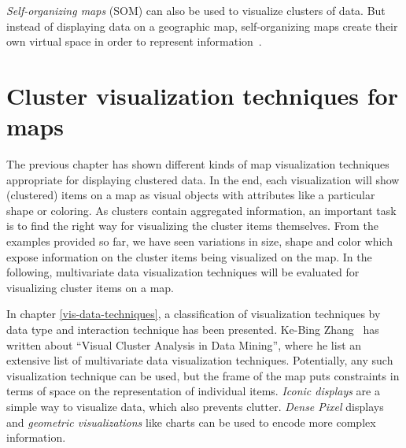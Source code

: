 \textit{Self-organizing maps} (SOM) can also be used to visualize clusters of data. But instead of displaying data on a geographic map, self-organizing maps create their own virtual space in order to represent information~\cite{noellenburg11geovis}.  


\section{Cluster visualization techniques for maps}
\label{chapter:cluster-vis}

The previous chapter has shown different kinds of map visualization techniques appropriate for displaying clustered data. In the end, each visualization will show (clustered) items on a map as visual objects with attributes like a particular shape or coloring. As clusters contain aggregated information, an important task is to find the right way for visualizing the cluster items themselves. From the examples provided so far, we have seen variations in size, shape and color which expose information on the cluster items being visualized on the map. In the following, multivariate data visualization techniques will be evaluated for visualizing cluster items on a map.

In chapter \ref{vis-data-techniques}, a classification of visualization techniques by data type and interaction technique has been presented. Ke-Bing Zhang~\cite{zhang07thesis} has written about ``Visual Cluster Analysis in Data Mining'', where he list an extensive list of multivariate data visualization techniques. Potentially, any such visualization technique can be used, but the frame of the map puts constraints in terms of space on the representation of individual items. \textit{Iconic displays} are a simple way to visualize data, which also prevents clutter. \textit{Dense Pixel} displays and \textit{geometric visualizations} like charts can be used to encode more complex information.


